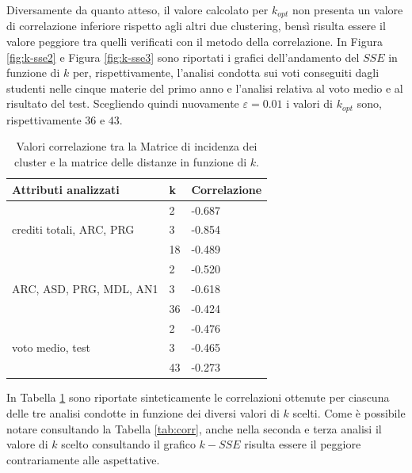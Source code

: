 \documentclass[12pt]{article}
\begin{document}
Diversamente da quanto atteso, il valore calcolato per $k_{opt}$ non presenta un valore di correlazione 
inferiore rispetto agli altri due clustering, 
bensì risulta essere il valore peggiore tra quelli verificati con il metodo della correlazione. 
In Figura \ref{fig:k-sse2} e Figura \ref{fig:k-sse3} sono riportati i grafici dell'andamento 
del $SSE$ in funzione di $k$ per, rispettivamente, 
l'analisi condotta sui voti conseguiti dagli studenti nelle cinque materie del primo anno e l'analisi relativa al voto medio e al risultato del test. 
Scegliendo quindi nuovamente $\varepsilon=0.01$ i valori di $k_{opt}$ sono, rispettivamente $36$ e $43$. 

\begin{table}[H]
\centering
\begin{tabular}{@{}l|l|l@{}}
\hline
\textbf{Attributi analizzati}   							& \textbf{k} & \textbf{Correlazione} \\ \hline
                                							& 2          & -0.687                \\ \cline{2-3} 
crediti totali, ARC, PRG        							& 3          & -0.854                \\ \cline{2-3} 
                                							& 18         & -0.489                \\ \hline
                                							& 2          & -0.520                \\ \cline{2-3} 
ARC, ASD, PRG, MDL,	AN1	\hspace{3em}									& 3          & -0.618                \\ \cline{2-3} 
                                							& 36         & -0.424                \\ \hline
                                							& 2          & -0.476                \\ \cline{2-3} 
voto medio, test                							& 3          & -0.465                \\ \cline{2-3} 
                                							& 43         & -0.273                \\ \hline
\end{tabular}
\caption{Valori correlazione tra la Matrice di incidenza dei cluster e la matrice delle distanze in funzione di $k$.}
\label{tab:corr2}
\end{table}

In Tabella \ref{tab:corr2} sono riportate sinteticamente le correlazioni ottenute per ciascuna delle tre analisi condotte in funzione dei diversi valori di $k$ scelti. Come è possibile notare consultando la Tabella \ref{tab:corr}, anche nella seconda e terza analisi il valore di $k$ scelto consultando il grafico $k-SSE$ risulta essere il peggiore contrariamente alle aspettative.
\end{document}
